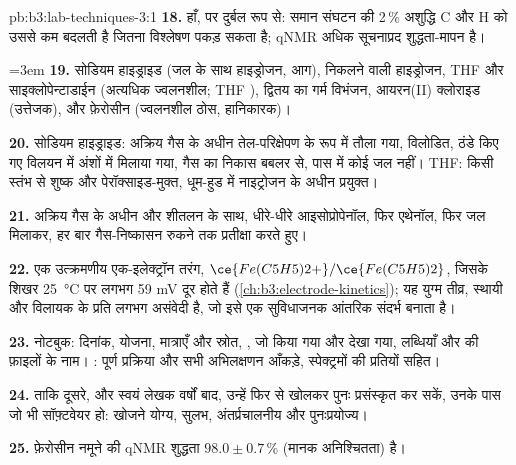 \begin{solution}{pb:b3:lab-techniques-3:1}
\textbf{18.} हाँ, पर दुर्बल रूप से: समान संघटन की 2\,\% अशुद्धि C और H को उससे कम बदलती है
जितना विश्लेषण पकड़ सकता है; qNMR अधिक सूचनाप्रद शुद्धता-मापन है।

\emergencystretch=3em \textbf{19.} सोडियम हाइड्राइड (जल के साथ हाइड्रोजन, आग), निकलने वाली हाइड्रोजन, THF और
साइक्लोपेन्टाडाईन (अत्यधिक ज्वलनशील; THF ), द्वितय का गर्म
विभंजन, आयरन(II) क्लोराइड (उत्तेजक), और फ़ेरोसीन (ज्वलनशील ठोस, हानिकारक)।

\textbf{20.} सोडियम हाइड्राइड: अक्रिय गैस के अधीन तेल-परिक्षेपण के रूप में तौला गया, विलोडित,
ठंडे किए गए विलयन में अंशों में मिलाया गया, गैस का निकास बबलर से, पास में कोई
जल नहीं। THF: किसी स्तंभ से शुष्क और पेरॉक्साइड-मुक्त, धूम-हुड में नाइट्रोजन के अधीन प्रयुक्त।

\textbf{21.} अक्रिय गैस के अधीन और शीतलन के साथ, धीरे-धीरे आइसोप्रोपेनॉल, फिर
एथेनॉल, फिर जल मिलाकर, हर बार गैस-निष्कासन रुकने तक प्रतीक्षा करते हुए।

\textbf{22.} एक उत्क्रमणीय एक-इलेक्ट्रॉन तरंग, $\ce{Fe(C5H5)2+}/\ce{Fe(C5H5)2}$, जिसके शिखर \qty{25}{\celsius} पर लगभग 59 mV दूर होते हैं
(\cref{ch:b3:electrode-kinetics}); यह युग्म तीव्र, स्थायी और विलायक के प्रति लगभग असंवेदी है,
जो इसे एक सुविधाजनक आंतरिक संदर्भ बनाता है।

\textbf{23.} नोटबुक: दिनांक, योजना, मात्राएँ और स्रोत, , जो
किया गया और देखा गया, लब्धियाँ और  की फ़ाइलों के नाम। : पूर्ण प्रक्रिया और सभी अभिलक्षणन आँकड़े, स्पेक्ट्रमों की
प्रतियों सहित।

\textbf{24.} ताकि दूसरे, और स्वयं लेखक वर्षों बाद, उन्हें फिर से खोलकर पुनः प्रसंस्कृत कर सकें,
उनके पास जो भी सॉफ़्टवेयर हो: खोजने योग्य, सुलभ, अंतर्प्रचालनीय और पुनःप्रयोज्य।

\textbf{25.} फ़ेरोसीन नमूने की qNMR शुद्धता $98.0 \pm 0.7$\,\% (मानक अनिश्चितता) है।
\end{solution}
